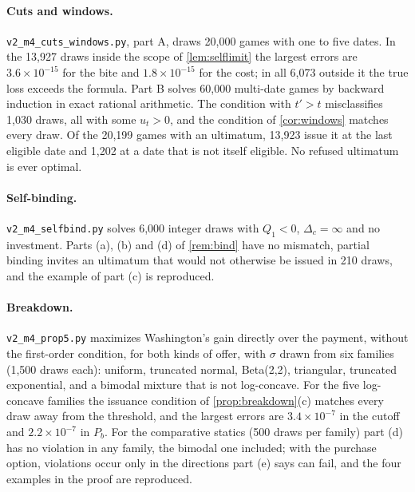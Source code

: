 \paragraph{Cuts and windows.} \texttt{v2\_m4\_cuts\_windows.py}, part A, draws 20,000 games with one to five dates. In the 13,927 draws inside the scope of \cref{lem:selflimit} the largest errors are $3.6\times10^{-15}$ for the bite and $1.8\times10^{-15}$ for the cost; in all 6,073 outside it the true loss exceeds the formula. Part B solves 60,000 multi-date games by backward induction in exact rational arithmetic. The condition with $t'>t$ misclassifies 1,030 draws, all with some $u_t>0$, and the condition of \cref{cor:windows} matches every draw. Of the 20,199 games with an ultimatum, 13,923 issue it at the last eligible date and 1,202 at a date that is not itself eligible. No refused ultimatum is ever optimal.

\paragraph{Self-binding.} \texttt{v2\_m4\_selfbind.py} solves 6,000 integer draws with $Q_1<0$, $\Delta_c=\infty$ and no investment. Parts (a), (b) and (d) of \cref{rem:bind} have no mismatch, partial binding invites an ultimatum that would not otherwise be issued in 210 draws, and the example of part (c) is reproduced.

\paragraph{Breakdown.} \texttt{v2\_m4\_prop5.py} maximizes Washington's gain directly over the payment, without the first-order condition, for both kinds of offer, with $\sigma$ drawn from six families (1,500 draws each): uniform, truncated normal, Beta(2,2), triangular, truncated exponential, and a bimodal mixture that is not log-concave. For the five log-concave families the issuance condition of \cref{prop:breakdown}(c) matches every draw away from the threshold, and the largest errors are $3.4\times10^{-7}$ in the cutoff and $2.2\times10^{-7}$ in $P_b$. For the comparative statics (500 draws per family) part (d) has no violation in any family, the bimodal one included; with the purchase option, violations occur only in the directions part (e) says can fail, and the four examples in the proof are reproduced.

